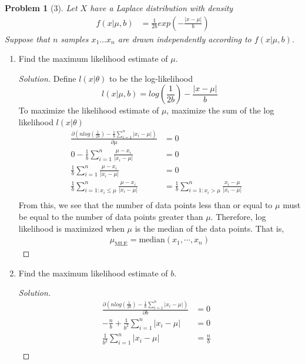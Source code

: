 \documentclass[11pt]{article}
\theoremstyle{quest}
\newtheorem*{problem}{Problem}
\newenvironment{solution}
  {\begin{mdframed}\begin{proof}[Solution]}
  {\end{proof}\end{mdframed}}
\begin{document}
\begin{problem}[3]
Let $X$ have a Laplace distribution with density
\begin{align*}
    f(x|\mu, b) &= \frac{1}{2b} exp(-\frac{|x-\mu|}{b})
\end{align*}
Suppose that $n$ samples $x_1\ldots x_n$ are drawn independently according to $f(x|\mu, b)$.
\end{problem}
    \begin{enumerate}[label=(\alph*)]
    \item Find the maximum likelihood estimate of $\mu$.
    \begin{solution}
        Define $l(x|\theta)$ to be the log-likelihood 
        \[
            l(x|\mu, b) = log(\frac{1}{2b}) -\frac{|x-\mu|}{b}
        \]
        To maximize the likelihood estimate of $\mu$, maximize the sum of the log likelihood $l(x|\theta)$
        \begin{align*}
        \frac{\partial (n log(\frac{1}{2b}) - \frac{1}{b}\sum_{i=1}^{n} |x_i-\mu|)}{\partial \mu}  &= 0 &\\
        0 - \frac{1}{b}\sum_{i=1}^{n} \frac{\mu-x_i}{|x_i-\mu|} &= 0 &\\
        \frac{1}{b}\sum_{i=1}^{n} \frac{\mu-x_i}{|x_i-\mu|} &= 0 &\\
        \frac{1}{b}\sum_{i=1 : x_i \leq \mu}^{n} \frac{\mu-x_i}{|x_i-\mu|} &= \frac{1}{b}\sum_{i=1 : x_i > \mu}^{n} \frac{x_i - \mu}{|x_i-\mu|} &\\
        \end{align*}
        From this, we see that the number of data points less than or equal to $\mu$ must be equal to the number of data points greater than $\mu$. Therefore, log likelihood is maximized when $\mu$ is the median of the data points. That is,
        \begin{align*}
        \mu_{\text{MLE}} = \text{median}(x_1, \cdots, x_n)
        \end{align*}
    \end{solution}
    \item Find the maximum likelihood estimate of $b$.
    \begin{solution}
        \begin{align*}
        \frac{\partial ( n log(\frac{1}{2b}) - \frac{1}{b}\sum_{i=1}^{n} |x_i-\mu| ) }{\partial b}  &= 0 &\\
        -\frac{n}{b} + \frac{1}{b^2}\sum_{i=1}^{n} |x_i-\mu| &= 0 &\\
         \frac{1}{b^2}\sum_{i=1}^{n} |x_i-\mu| &= \frac{n}{b} &\\

\end{align*}
\end{solution}
\end{enumerate}
\end{document}

